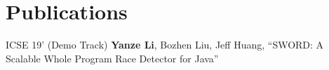 \documentclass[12pt,letterpaper]{report}
\begin{document}
	\section*{Publications}
	\begin{tablist}
		\item[ICSE 19'] \tab (Demo Track) \textbf{Yanze Li}, Bozhen Liu, Jeff Huang, \enquote{SWORD: A Scalable Whole Program Race Detector for Java}
	\end{tablist}
	
	
	
%	
%	
%		
%		
%		
%	
%	
%	
%	
%		
%		
%	
%	
%	
%	
%		
%		
\end{document}
